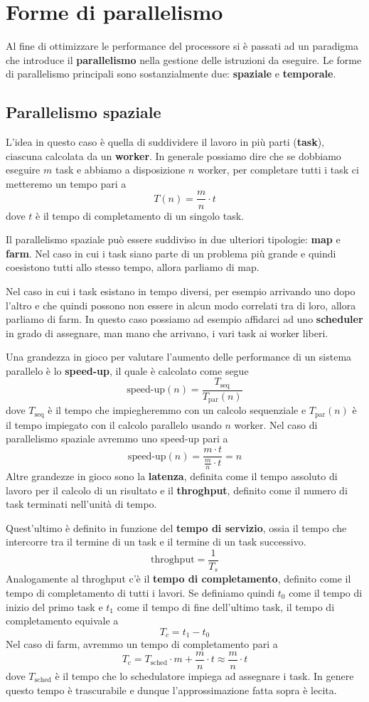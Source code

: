 \chapter{Forme di parallelismo}
Al fine di ottimizzare le performance del processore si è passati ad un paradigma che introduce il
\textbf{parallelismo} nella gestione delle istruzioni da eseguire. Le forme di parallelismo
principali sono sostanzialmente due: \textbf{spaziale} e \textbf{temporale}.

\section{Parallelismo spaziale}
L'idea in questo caso è quella di suddividere il lavoro in più parti (\textbf{task}), ciascuna
calcolata da un \textbf{worker}. In generale possiamo dire che se dobbiamo eseguire $m$ task e
abbiamo a disposizione $n$ worker, per completare tutti i task ci metteremo un tempo pari a
\[ T(n) = \frac{m}{n} \cdot t \]
dove $t$ è il tempo di completamento di un singolo task.

Il parallelismo spaziale può essere suddiviso in due ulteriori tipologie: \textbf{map} e
\textbf{farm}. Nel caso in cui i task siano parte di un problema più grande e quindi coesistono
tutti allo stesso tempo, allora parliamo di map.

Nel caso in cui i task esistano in tempo diversi, per esempio arrivando uno dopo l'altro e che
quindi possono non essere in alcun modo correlati tra di loro, allora parliamo di farm. In questo
caso possiamo ad esempio affidarci ad uno \textbf{scheduler} in grado di assegnare, man mano che
arrivano, i vari task ai worker liberi.

Una grandezza in gioco per valutare l'aumento delle performance di un sistema parallelo è lo
\textbf{speed-up}, il quale è calcolato come segue
\[ \text{speed-up} (n) = \frac{T_\text{seq}}{T_\text{par} (n)} \]
dove $T_\text{seq}$ è il tempo che impiegheremmo con un calcolo sequenziale e $T_\text{par} (n)$
è il tempo impiegato con il calcolo parallelo usando $n$ worker. Nel caso di parallelismo spaziale
avremmo uno speed-up pari a
\[ \text{speed-up} (n) = \frac{m \cdot t}{\frac{m}{n} \cdot t} = n \]
Altre grandezze in gioco sono la \textbf{latenza}, definita come il tempo assoluto di lavoro per il
calcolo di un risultato e il \textbf{throghput}, definito come il numero di task terminati
nell'unità di tempo.

Quest'ultimo è definito in funzione del \textbf{tempo di servizio}, ossia il tempo che intercorre
tra il termine di un task e il termine di un task successivo.
\[ \text{throghput} = \frac{1}{T_s} \]
Analogamente al throghput c'è il \textbf{tempo di completamento}, definito come il tempo di
completamento di tutti i lavori. Se definiamo quindi $t_0$ come il tempo di inizio del primo task
e $t_1$ come il tempo di fine dell'ultimo task, il tempo di completamento equivale a
\[ T_c = t_1 - t_0 \]
Nel caso di farm, avremmo un tempo di completamento pari a
\[ T_c = T_\text{sched} \cdot m + \frac{m}{n} \cdot t \approx \frac{m}{n} \cdot t \]
dove $T_\text{sched}$ è il tempo che lo schedulatore impiega ad assegnare i task. In genere questo
tempo è trascurabile e dunque l'approssimazione fatta sopra è lecita.

